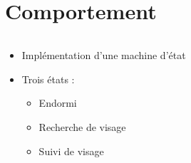 \section{Comportement}
\begin{frame}
  \begin{columns}[T]
    \begin{column}{.5\textwidth}
      \begin{itemize}
        \item Implémentation d'une machine d'état
        \item Trois états :
          \begin{itemize}
            \item Endormi
            \item Recherche de visage
            \item Suivi de visage
          \end{itemize}
      \end{itemize}
    \end{column}
    \begin{column}{.5\textwidth}
      \begin{figure}
        
      \end{figure}
    \end{column}
 \end{columns}
\end{frame}

